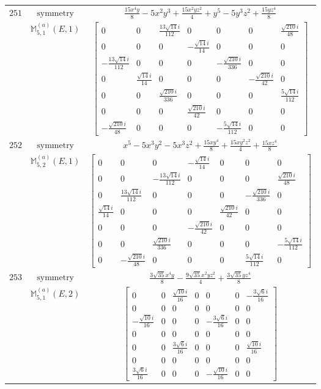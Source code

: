 \documentclass[fleqn,8pt,landscape]{jsarticle}
\begin{document}
\begin{longtable}{ccc}
$ 251 $ & $ \text{symmetry} $ & $ \frac{15 x^{4} y}{8} - 5 x^{2} y^{3} + \frac{15 x^{2} y z^{2}}{4} + y^{5} - 5 y^{3} z^{2} + \frac{15 y z^{4}}{8} $ \\
$  $ & $ \mathbb{M}_{5,1}^{(a)}(E,1) $ & $ \begin{bmatrix} 0 & 0 & \frac{13 \sqrt{14} i}{112} & 0 & 0 & 0 & \frac{\sqrt{210} i}{48} \\ 0 & 0 & 0 & - \frac{\sqrt{14} i}{14} & 0 & 0 & 0 \\ - \frac{13 \sqrt{14} i}{112} & 0 & 0 & 0 & - \frac{\sqrt{210} i}{336} & 0 & 0 \\ 0 & \frac{\sqrt{14} i}{14} & 0 & 0 & 0 & - \frac{\sqrt{210} i}{42} & 0 \\ 0 & 0 & \frac{\sqrt{210} i}{336} & 0 & 0 & 0 & \frac{5 \sqrt{14} i}{112} \\ 0 & 0 & 0 & \frac{\sqrt{210} i}{42} & 0 & 0 & 0 \\ - \frac{\sqrt{210} i}{48} & 0 & 0 & 0 & - \frac{5 \sqrt{14} i}{112} & 0 & 0 \end{bmatrix} $ \\ \hline
$ 252 $ & $ \text{symmetry} $ & $ x^{5} - 5 x^{3} y^{2} - 5 x^{3} z^{2} + \frac{15 x y^{4}}{8} + \frac{15 x y^{2} z^{2}}{4} + \frac{15 x z^{4}}{8} $ \\
$  $ & $ \mathbb{M}_{5,2}^{(a)}(E,1) $ & $ \begin{bmatrix} 0 & 0 & 0 & - \frac{\sqrt{14} i}{14} & 0 & 0 & 0 \\ 0 & 0 & - \frac{13 \sqrt{14} i}{112} & 0 & 0 & 0 & \frac{\sqrt{210} i}{48} \\ 0 & \frac{13 \sqrt{14} i}{112} & 0 & 0 & 0 & - \frac{\sqrt{210} i}{336} & 0 \\ \frac{\sqrt{14} i}{14} & 0 & 0 & 0 & \frac{\sqrt{210} i}{42} & 0 & 0 \\ 0 & 0 & 0 & - \frac{\sqrt{210} i}{42} & 0 & 0 & 0 \\ 0 & 0 & \frac{\sqrt{210} i}{336} & 0 & 0 & 0 & - \frac{5 \sqrt{14} i}{112} \\ 0 & - \frac{\sqrt{210} i}{48} & 0 & 0 & 0 & \frac{5 \sqrt{14} i}{112} & 0 \end{bmatrix} $ \\ \hline
$ 253 $ & $ \text{symmetry} $ & $ \frac{3 \sqrt{35} x^{4} y}{8} - \frac{9 \sqrt{35} x^{2} y z^{2}}{4} + \frac{3 \sqrt{35} y z^{4}}{8} $ \\
$  $ & $ \mathbb{M}_{5,1}^{(a)}(E,2) $ & $ \begin{bmatrix} 0 & 0 & \frac{\sqrt{10} i}{16} & 0 & 0 & 0 & - \frac{3 \sqrt{6} i}{16} \\ 0 & 0 & 0 & 0 & 0 & 0 & 0 \\ - \frac{\sqrt{10} i}{16} & 0 & 0 & 0 & - \frac{3 \sqrt{6} i}{16} & 0 & 0 \\ 0 & 0 & 0 & 0 & 0 & 0 & 0 \\ 0 & 0 & \frac{3 \sqrt{6} i}{16} & 0 & 0 & 0 & \frac{\sqrt{10} i}{16} \\ 0 & 0 & 0 & 0 & 0 & 0 & 0 \\ \frac{3 \sqrt{6} i}{16} & 0 & 0 & 0 & - \frac{\sqrt{10} i}{16} & 0 & 0 \end{bmatrix} $ \\ \hline

\end{longtable}
\end{document}
